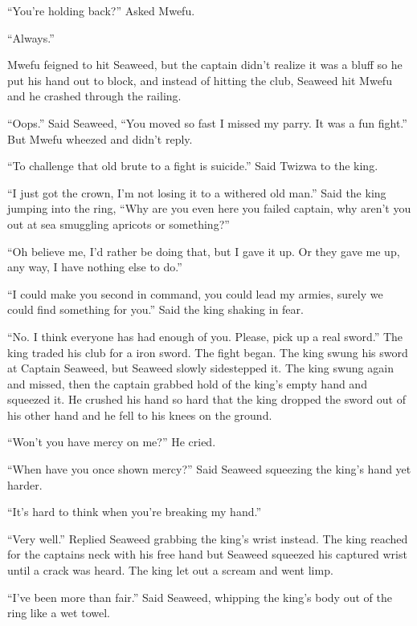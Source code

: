 ``You're holding back?'' Asked Mwefu.

``Always.''

Mwefu feigned to hit Seaweed, but the captain didn't realize it was a bluff so he put his hand out to block, and instead of hitting the club, Seaweed hit Mwefu and he crashed through the railing.

``Oops.'' Said Seaweed, ``You moved so fast I missed my parry. It was a fun fight.'' But Mwefu wheezed and didn't reply.

``To challenge that old brute to a fight is suicide.'' Said Twizwa to the king.

``I just got the crown, I'm not losing it to a withered old man.'' Said the king jumping into the ring, ``Why are you even here you failed captain, why aren't you out at sea smuggling apricots or something?''

``Oh believe me, I'd rather be doing that, but I gave it up. Or they gave me up, any way, I have nothing else to do.''

``I could make you second in command, you could lead my armies, surely we could find something for you.'' Said the king shaking in fear.

``No. I think everyone has had enough of you. Please, pick up a real sword.'' The king traded his club for a iron sword. The fight began. The king swung his sword at Captain Seaweed, but Seaweed slowly sidestepped it. The king swung again and missed, then the captain grabbed hold of the king's empty hand and squeezed it. He crushed his hand so hard that the king dropped the sword out of his other hand and he fell to his knees on the ground.

``Won't you have mercy on me?'' He cried.

``When have you once shown mercy?'' Said Seaweed squeezing the king's hand yet harder.

``It's hard to think when you're breaking my hand.''


``Very well.'' Replied Seaweed grabbing the king's wrist instead. The king reached for the captains neck with his free hand but Seaweed squeezed his captured wrist until a crack was heard. The king let out a scream and went limp.

``I've been more than fair.'' Said Seaweed, whipping the king's body out of the ring like a wet towel.
